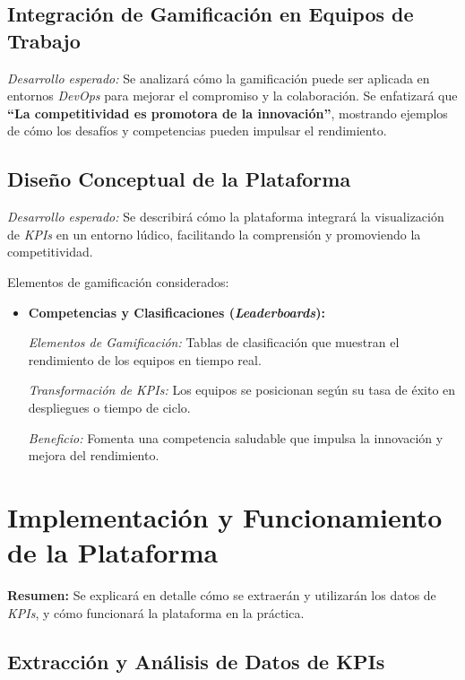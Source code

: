 \documentclass[journal]{IEEEtran}
\begin{document}
\subsection{\textbf{ Integración de Gamificación en Equipos de Trabajo}}

\textit{Desarrollo esperado:} Se analizará cómo la gamificación puede ser aplicada en entornos \textit{DevOps} para mejorar el compromiso y la colaboración. Se enfatizará que \textbf{``La competitividad es promotora de la innovación''}, mostrando ejemplos de cómo los desafíos y competencias pueden impulsar el rendimiento.

\subsection{\textbf{ Diseño Conceptual de la Plataforma}}

\textit{Desarrollo esperado:} Se describirá cómo la plataforma integrará la visualización de \textit{KPIs} en un entorno lúdico, facilitando la comprensión y promoviendo la competitividad.

Elementos de gamificación considerados:

\begin{itemize}
    \item \textbf{Competencias y Clasificaciones (\textit{Leaderboards}):}
    
    \textit{Elementos de Gamificación:} Tablas de clasificación que muestran el rendimiento de los equipos en tiempo real.
    
    \textit{Transformación de \textit{KPIs}:} Los equipos se posicionan según su tasa de éxito en despliegues o tiempo de ciclo.
    
    \textit{Beneficio:} Fomenta una competencia saludable que impulsa la innovación y mejora del rendimiento.
\end{itemize}

\section{\textbf{\Large Implementación y Funcionamiento de la Plataforma}}

\textbf{Resumen:} Se explicará en detalle cómo se extraerán y utilizarán los datos de \textit{KPIs}, y cómo funcionará la plataforma en la práctica.

\subsection{\textbf{ Extracción y Análisis de Datos de KPIs}}
\end{document}
